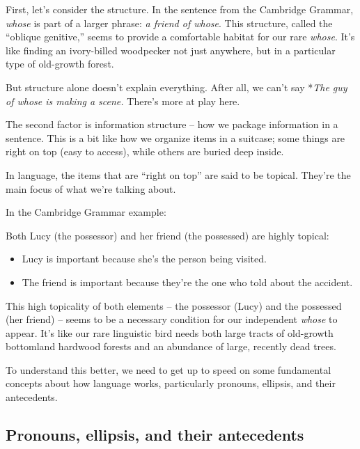 First, let's consider the structure. In the sentence from the Cambridge Grammar, \textit{whose} is part of a larger phrase: \textit{a friend of whose}. This structure, called the ``oblique genitive,'' seems to provide a comfortable habitat for our rare \textit{whose}. It's like finding an ivory-billed woodpecker not just anywhere, but in a particular type of old-growth forest.

But structure alone doesn't explain everything. After all, we can't say *\textit{The guy of whose is making a scene.} There's more at play here.

The second factor is information structure -- how we package information in a sentence. This is a bit like how we organize items in a suitcase; some things are right on top (easy to access), while others are buried deep inside.

In language, the items that are ``right on top'' are said to be topical. They're the main focus of what we're talking about.

In the Cambridge Grammar example:

\z

Both Lucy (the possessor) and her friend (the possessed) are highly topical:

\begin{itemize}
    \item Lucy is important because she's the person being visited.
    \item The friend is important because they're the one who told about the accident.
\end{itemize}

This high topicality of both elements -- the possessor (Lucy) and the possessed (her friend) -- seems to be a necessary condition for our independent \textit{whose} to appear. It's like our rare linguistic bird needs both large tracts of old-growth bottomland hardwood forests and an abundance of large, recently dead trees.

To understand this better, we need to get up to speed on some fundamental concepts about how language works, particularly pronouns, ellipsis, and their antecedents.

\subsection{Pronouns, ellipsis, and their antecedents}


